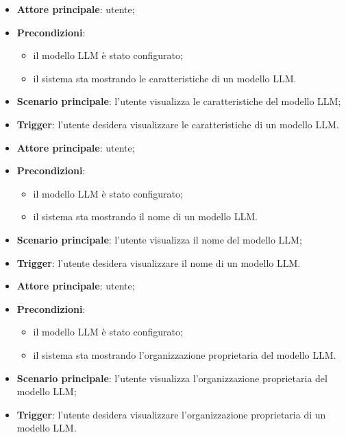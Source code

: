 \documentclass[10pt, a4paper]{article}
\begin{document}
    \begin{itemize}
        \item \textbf{Attore principale}: utente;
        \item \textbf{Precondizioni}:
            \begin{itemize}
                \item il modello LLM è stato configurato;
                \item il sistema sta mostrando le caratteristiche di un modello LLM.
            \end{itemize}
        \item \textbf{Scenario principale}: l'utente visualizza le caratteristiche del modello LLM;
        \item \textbf{Trigger}: l’utente desidera visualizzare le caratteristiche di un modello LLM.
    \end{itemize}

    \begin{itemize}
        \item \textbf{Attore principale}: utente;
        \item \textbf{Precondizioni}:
            \begin{itemize}
                \item il modello LLM è stato configurato;
                \item il sistema sta mostrando il nome di un modello LLM.
            \end{itemize}
        \item \textbf{Scenario principale}: l'utente visualizza il nome del modello LLM;
        \item \textbf{Trigger}: l’utente desidera visualizzare il nome di un modello LLM.
    \end{itemize}

    \begin{itemize}
        \item \textbf{Attore principale}: utente;
        \item \textbf{Precondizioni}:
            \begin{itemize}
                \item il modello LLM è stato configurato;
                \item il sistema sta mostrando l'organizzazione proprietaria del modello LLM.
            \end{itemize}
        \item \textbf{Scenario principale}: l'utente visualizza l'organizzazione proprietaria del modello LLM;
        \item \textbf{Trigger}: l’utente desidera visualizzare l'organizzazione proprietaria di un modello LLM.
    \end{itemize}
\end{document}

